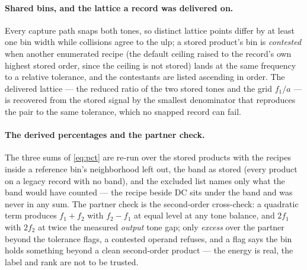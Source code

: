 \documentclass[11pt,a4paper]{article}
\begin{document}
\paragraph{Shared bins, and the lattice a record was delivered on.}
Every capture path snaps both tones, so distinct lattice points differ by
at least one bin width while collisions agree to the ulp; a stored
product's bin is \emph{contested} when another enumerated recipe (the
default ceiling raised to the record's own highest stored order, since
the ceiling is not stored) lands at the same frequency to a relative
tolerance, and the contestants are listed ascending in order. The
delivered lattice --- the reduced ratio of the two stored tones and the
grid $f_1/a$ --- is recovered from the stored signal by the smallest
denominator that reproduces the pair to the same tolerance, which no
snapped record can fail.

\paragraph{The derived percentages and the partner check.}
The three sums of \eqref{eq:pct} are re-run over the stored products with
the recipes inside a reference bin's neighborhood left out, the band as
stored (every product on a legacy record with no band), and the excluded
list names only what the band would have counted --- the recipe beside DC
sits under the band and was never in any sum. The partner check is the
second-order cross-check: a quadratic term produces $f_1 + f_2$ with
$f_2 - f_1$ at equal level at any tone balance, and $2f_1$ with $2f_2$ at
twice the measured \emph{output} tone gap; only \emph{excess} over the
partner beyond the tolerance flags, a contested operand refuses, and a
flag says the bin holds something beyond a clean second-order product ---
the energy is real, the label and rank are not to be trusted.
\end{document}
